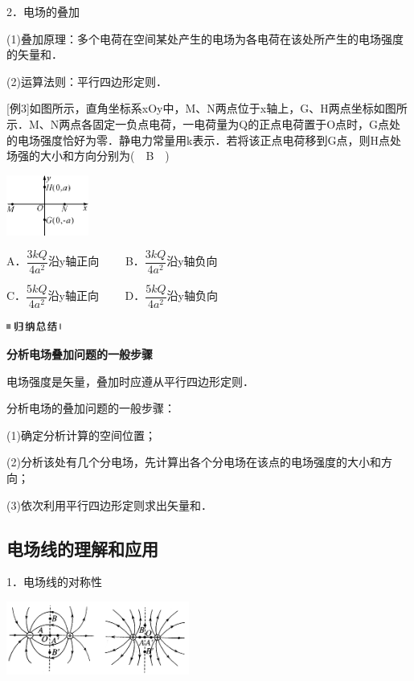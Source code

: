 2．电场的叠加

(1)叠加原理：多个电荷在空间某处产生的电场为各电荷在该处所产生的电场强度的矢量和．

(2)运算法则：平行四边形定则．

{[}例3{]}如图所示，直角坐标系xOy中，M、N两点位于x轴上，G、H两点坐标如图所示．M、N两点各固定一负点电荷，一电荷量为Q的正点电荷置于O点时，G点处的电场强度恰好为零．静电力常量用k表示．若将该正点电荷移到G点，则H点处场强的大小和方向分别为(　B　)

\begin{center}\includegraphics[width=1.0625in,height=0.78125in]{media/image263.png}\end{center}

A．$\dfrac{3kQ}{4a^2}$沿y轴正向　　 B．$\dfrac{3kQ}{4a^2}$沿y轴负向

C．$\dfrac{5kQ}{4a^2}$沿y轴正向　　 D．$\dfrac{5kQ}{4a^2}$沿y轴负向

\begin{center}\includegraphics[width=0.70833in,height=0.125in]{media/image13.png}

\textbf{分析电场叠加问题的一般步骤}
\end{center}


电场强度是矢量，叠加时应遵从平行四边形定则．

分析电场的叠加问题的一般步骤：

(1)确定分析计算的空间位置；

(2)分析该处有几个分电场，先计算出各个分电场在该点的电场强度的大小和方向；

(3)依次利用平行四边形定则求出矢量和．
\newpage
\subsection{电场线的理解和应用}

1．电场线的对称性

\begin{center}\includegraphics[width=2.36458in,height=0.94792in]{media/image264.png}\end{center}

